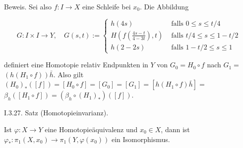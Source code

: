 \documentclass[10pt, letterpaper]{article}
\begin{document}
Beweis. Sei also $f: I \rightarrow X$ eine Schleife bei $x_{0}$. Die Abbildung

$$
G: I \times I \rightarrow Y, \quad G(s, t):= \begin{cases}h(4 s) & \text { falls } 0 \leq s \leq t / 4 \\ H\left(f\left(\frac{4 s-t}{4-3 t}\right), t\right) & \text { falls } t / 4 \leq s \leq 1-t / 2 \\ h(2-2 s) & \text { falls } 1-t / 2 \leq s \leq 1\end{cases}
$$

definiert eine Homotopie relativ Endpunkten in $Y$ von $G_{0}=H_{0} \circ f$ nach $G_{1}=$ $\left(h\left(H_{1} \circ f\right)\right) \bar{h}$. Also gilt $\left(H_{0}\right)_{*}([f])=\left[H_{0} \circ f\right]=\left[G_{0}\right]=\left[G_{1}\right]=\left[h\left(H_{1} \circ f\right) \bar{h}\right]=$ $\beta_{h}\left(\left[H_{1} \circ f\right]\right)=\left(\beta_{h} \circ\left(H_{1}\right)_{*}\right)([f])$.



I.3.27. Satz (Homotopieinvarianz). 

Ist $\varphi: X \rightarrow Y$ eine Homotopieäquivalenz und $x_{0} \in X$, dann ist $\varphi_{*}: \pi_{1}\left(X, x_{0}\right) \rightarrow \pi_{1}\left(Y, \varphi\left(x_{0}\right)\right)$ ein Isomorphismus.
\end{document}
